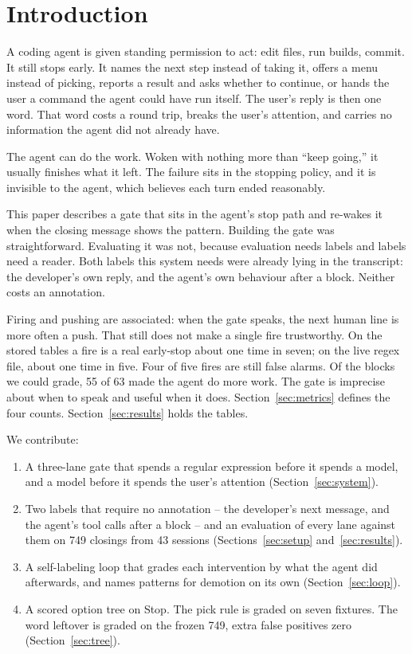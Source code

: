 \section{Introduction}

A coding agent is given standing permission to act: edit files, run builds,
commit. It still stops early. It names the next step instead of taking it,
offers a menu instead of picking, reports a result and asks whether to
continue, or hands the user a command the agent could have run itself. The
user's reply is then one word. That word costs a round trip, breaks the
user's attention, and carries no information the agent did not already have.

The agent can do the work. Woken with nothing more than ``keep going,'' it
usually finishes what it left. The failure sits in the stopping policy, and it
is invisible to the agent, which believes each turn ended reasonably.

This paper describes a gate that sits in the agent's stop path and re-wakes it
when the closing message shows the pattern. Building the gate was
straightforward. Evaluating it was not, because evaluation needs labels and
labels need a reader. Both labels this system needs were already lying in the
transcript: the developer's own reply, and the agent's own behaviour after a
block. Neither costs an annotation.

Firing and pushing are associated: when the gate speaks, the next human
line is more often a push. That still does not make a single fire
trustworthy. On the stored tables a fire is a real early-stop about one
time in seven; on the live regex file, about one time in five. Four of
five fires are still false alarms. Of the blocks we could grade, 55 of
63 made the agent do more work. The gate is imprecise about when to speak
and useful when it does. Section~\ref{sec:metrics} defines the four
counts. Section~\ref{sec:results} holds the tables.

We contribute:

\begin{enumerate}
  \item A three-lane gate that spends a regular expression before it spends a
        model, and a model before it spends the user's attention
        (Section~\ref{sec:system}).
  \item Two labels that require no annotation -- the developer's next message,
        and the agent's tool calls after a block -- and an evaluation of every
        lane against them on 749 closings from 43 sessions
        (Sections~\ref{sec:setup} and~\ref{sec:results}).
  \item A self-labeling loop that grades each intervention by what the agent
        did afterwards, and names patterns for demotion on its own
        (Section~\ref{sec:loop}).
  \item A scored option tree on Stop. The pick rule is graded on seven
        fixtures. The word leftover is graded on the frozen 749, extra
        false positives zero (Section~\ref{sec:tree}).
\end{enumerate}

